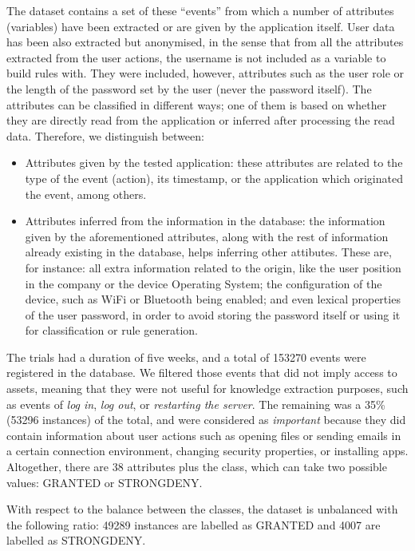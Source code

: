\documentclass[a4paper,10pt,twocolumn,preprint,3p]{elsarticle}
\begin{document}
The dataset contains a set of these ``events'' from which a number of attributes (variables) have been extracted or are given by the application itself. User data has been also extracted but anonymised, in the sense that from all the attributes extracted from the user actions, the username is not included as a variable to build rules with. They were included, however, attributes such as the user role or the length of the password set by the user (never the password itself). The attributes can be classified in different ways; one of them is based on whether they are directly read from the application or inferred after processing the read data. Therefore, we distinguish between:
\begin{itemize}
  \item Attributes given by the tested application: these attributes
    are related to the type of the event (action), its timestamp, or
    the application which originated the event, among others. 
  \item Attributes inferred from the information in the database: the information given by the aforementioned attributes, along with the rest of information already existing in the database, helps inferring other attibutes. These are, for instance: all extra information related to the origin, like the user position in the company or the device Operating System; the configuration of the device, such as WiFi or Bluetooth being enabled; and even lexical properties of the user password, in order to avoid storing the password itself or using it for classification or rule generation.
\end{itemize}

The trials had a duration of five weeks, and a total of 
153270 events were registered in the database. We filtered those events that did not imply access to assets, meaning that they were not useful for
knowledge extraction purposes, such as events of \textit{log in},
\textit{log out}, or \textit{restarting the server}.
The remaining was a 35\% (53296 instances) of the total, and were considered as \textit{important}
because they did contain information about user actions such as
opening files or sending emails in a certain connection environment,
changing security properties, or installing apps. Altogether, there
are 38 attributes plus the class, which can take two possible values:
GRANTED or STRONGDENY. 

With respect to the balance between the classes, the dataset is
unbalanced with the following ratio: 49289 instances are labelled as
GRANTED and 4007 are labelled as STRONGDENY. 
\end{document}

